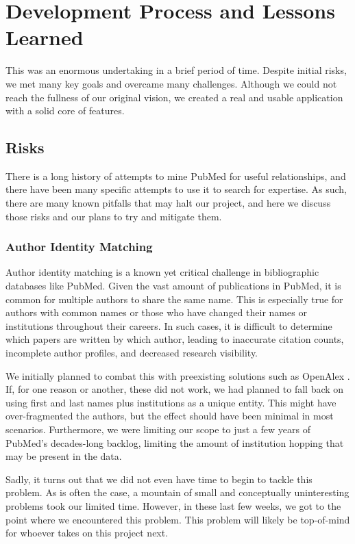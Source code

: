 \section{Development Process and Lessons Learned}

This was an enormous undertaking in a brief period of time. Despite initial risks, we met many key goals and overcame many challenges. Although we could not reach the fullness of our original vision, we created a real and usable application with a solid core of features. 

\subsection{Risks}

There is a long history of attempts to mine PubMed for useful relationships, and there have been many specific attempts to use it to search for expertise. As such, there are many known pitfalls that may halt our project, and here we discuss those risks and our plans to try and mitigate them. 

\subsubsection{Author Identity Matching}
Author identity matching is a known yet critical challenge in bibliographic databases like PubMed. Given the vast amount of publications in PubMed, it is common for multiple authors to share the same name. This is especially true for authors with common names or those who have changed their names or institutions throughout their careers. In such cases, it is difficult to determine which papers are written by which author, leading to inaccurate citation counts, incomplete author profiles, and decreased research visibility. 

We initially planned to combat this with preexisting solutions such as OpenAlex \cite{ref-openalex}. If, for one reason or another, these did not work, we had planned to fall back on using first and last names plus institutions as a unique entity. This might have over-fragmented the authors, but the effect should have been minimal in most scenarios. Furthermore, we were limiting our scope to just a few years of PubMed's decades-long backlog, limiting the amount of institution hopping that may be present in the data. 

Sadly, it turns out that we did not even have time to begin to tackle this problem. As is often the case, a mountain of small and conceptually uninteresting problems took our limited time. However, in these last few weeks, we got to the point where we encountered this problem. This problem will likely be top-of-mind for whoever takes on this project next. 


